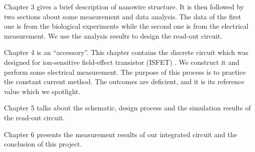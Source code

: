 Chapter 3 gives a brief description of nanowire structure.
It is then followed by two sections about some measurement and data analysis.
The data of the first one is from the biological experiments while the second one is from the electrical measurement.
We use the analysis results to design the read-out circuit.

Chapter 4 is an ``accessory''.
This chapter contains the discrete circuit which was designed for ion-sensitive field-effect transistor (ISFET) \cite{SF1}.
We construct it and perform some electrical measurement.
The purpose of this process is to practice the constant current method.
The outcomes are deficient, and it is its reference value which we spotlight.

Chapter 5 talks about the schematic, design process and the simulation results of the read-out circuit.

Chapter 6 presents the measurement results of our integrated circuit and the conclusion of this project.








%
%
%
%

%
%





